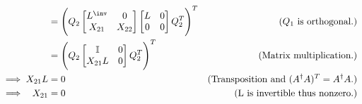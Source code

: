 \begin{solution}
\begin{itemize}
\begin{align}
        &= \Bigg( Q_2 \begin{bmatrix}L^\inv &0 \\X_{21} &X_{22}\end{bmatrix}\begin{bmatrix}L &0\\0&0\end{bmatrix}Q_2^T\Bigg)^T &\text{($Q_1$ is orthogonal.)}\nonumber\\
        &= \Bigg( Q_2 \begin{bmatrix}\id &0 \\X_{21}L &0\end{bmatrix}Q_2^T\Bigg)^T &\text{(Matrix multiplication.)}\nonumber\\
        \implies X_{21}L &= 0 &\text{(Transposition and $(A^\dag A)^T = A^\dag A$.)}\nonumber\\
        \implies \ \ X_{21} &= 0 &\text{(L is invertible thus nonzero.)}\nonumber
        \end{align}
        \alignbreak
        

\end{itemize}
\end{solution}
